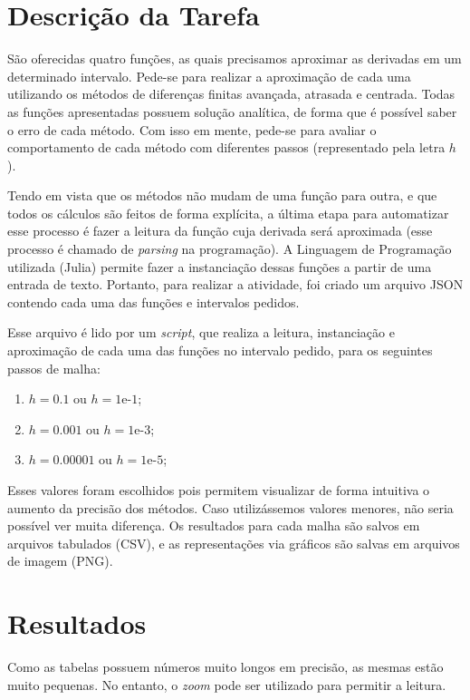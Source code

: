 \documentclass[12pt]{article}
\begin{document}


\singlespacing
\newpage
\tableofcontents

\newpage
\section{Descrição da Tarefa}
São oferecidas quatro funções, as quais precisamos aproximar as derivadas em um determinado intervalo. Pede-se para realizar a aproximação de cada uma utilizando os métodos de diferenças finitas avançada, atrasada e centrada. Todas as funções apresentadas possuem solução analítica, de forma que é possível saber o erro de cada método. Com isso em mente, pede-se para avaliar o comportamento de cada método com diferentes passos (representado pela letra $h$).

Tendo em vista que os métodos não mudam de uma função para outra, e que todos os cálculos são feitos de forma explícita, a última etapa para automatizar esse processo é fazer a leitura da função cuja derivada será aproximada (esse processo é chamado de \textit{parsing} na programação). A Linguagem de Programação utilizada (Julia) permite fazer a instanciação dessas funções a partir de uma entrada de texto. Portanto, para realizar a atividade, foi criado um arquivo JSON contendo cada uma das funções e intervalos pedidos.

Esse arquivo é lido por um \textit{script}, que realiza a leitura, instanciação e aproximação de cada uma das funções no intervalo pedido, para os seguintes passos de malha:
\begin{enumerate}
    \item $h=0.1$ ou $h=1 \text{e-}1$;
    \item $h=0.001$ ou $h=1 \text{e-}3$;
    \item $h=0.00001$ ou $h=1 \text{e-}5$;
\end{enumerate}
Esses valores foram escolhidos pois permitem visualizar de forma intuitiva o aumento da precisão dos métodos. Caso utilizássemos valores menores, não seria possível ver muita diferença. Os resultados para cada malha são salvos em arquivos tabulados (CSV), e as representações via gráficos são salvas em arquivos de imagem (PNG).

\section{Resultados}
Como as tabelas possuem números muito longos em precisão, as mesmas estão muito pequenas. No entanto, o \textit{zoom} pode ser utilizado para permitir a leitura.
\end{document}
